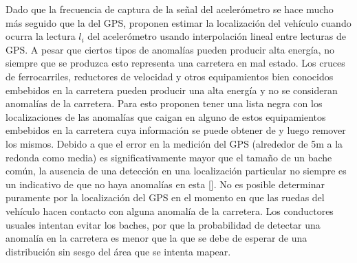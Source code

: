 Dado que la frecuencia de captura de la señal del acelerómetro se hace mucho más seguido que la del GPS, proponen estimar la localización del vehículo
cuando ocurra la lectura $l_i$ del acelerómetro usando interpolación lineal entre lecturas de GPS. A pesar que ciertos tipos de anomalías pueden producir
alta energía, no siempre que se produzca esto representa una carretera en mal estado. Los cruces de ferrocarriles, reductores de velocidad y otros
equipamientos bien conocidos embebidos en la carretera pueden producir una alta energía y no se consideran anomalías de la carretera. Para esto proponen
tener una lista negra con los localizaciones de las anomalías que caigan en alguno de estos equipamientos embebidos en la carretera cuya información se
puede obtener de y luego remover los mismos. Debido a que el error en la medición del GPS (alrededor de 5m a la redonda como media) es significativamente
mayor que el tamaño de un bache común, la ausencia de una detección en una localización particular no siempre es un indicativo de que no haya anomalías en
esta []. No es posible determinar puramente por la localización del GPS en el momento en que las ruedas del vehículo hacen contacto con alguna anomalía de
la carretera. Los conductores usuales intentan evitar los baches, por que la probabilidad de detectar una anomalía en la carretera es menor que la que se
debe de esperar de una distribución sin sesgo del área que se intenta mapear.\\
